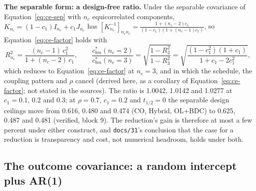 \documentclass[11pt]{article}
\newcommand{\code}[1]{\texttt{#1}}
\begin{document}
\textbf{The separable form: a design-free ratio.} Under the separable
covariance of Equation~\eqref{eq:ce-sep} with $n_c$ equicorrelated
components, $K_{n_c} = (1 - c_1) I_{n_c} + c_1 J_{n_c}$ has
$[K_{n_c}^{-1}]_{n_c n_c} = \frac{1 + (n_c-2)c_1}{(1 - c_1)(1 + (n_c-1)c_1)}$, so
Equation~\eqref{eq:ce-factor} holds with
\begin{equation}
R_{n_c}^2 = \frac{(n_c - 1)\, c_1^2}{1 + (n_c - 2)\, c_1}, \qquad
\frac{c_{bm}^{\ast}(n_c = 2)}{c_{bm}^{\ast}(n_c = 3)} =
\sqrt{\frac{1 - R_2^2}{1 - R_3^2}} =
\sqrt{\frac{(1 - c_1^2)(1 + c_1)}{1 + c_1 - 2c_1^2}},
\label{eq:invc-sep-K}
\end{equation}
which reduces to Equation~\eqref{eq:ce-factor} at $n_c = 3$, and in which
the schedule, the coupling pattern and $\rho$ cancel (derived here, as
a corollary of Equation~\eqref{eq:ce-factor}; not stated in the
sources). The ratio is 1.0042, 1.0142 and 1.0277 at $c_1 = 0.1$, 0.2
and 0.3; at $\rho = 0.7$, $c_1 = 0.2$ and $t_{1/2} = 0$ the separable
design ceilings move from 0.616, 0.480 and 0.474 (CO, Hybrid, OL+BDC)
to 0.625, 0.487 and 0.481 (verified, block 9). The reduction's gain is
therefore at most a few percent under either construct, and
\code{docs/31}'s conclusion that the case for a reduction is
transparency and cost, not numerical headroom, holds under both.

\subsection{The outcome covariance: a random intercept plus AR(1)}
\end{document}
